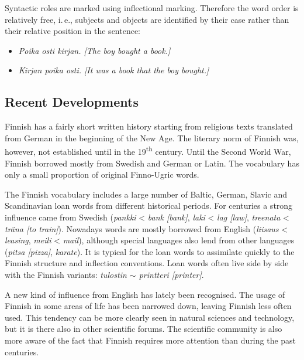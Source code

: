\begin{multicols}{2}
Syntactic roles are marked using inflectional marking. Therefore the word order
is relatively free, i.\,e., subjects and objects are identified by their case
rather than their relative position in the sentence:

\begin{itemize}
\item \textit{\foreignlanguage{finnish}{\textit{Poika osti kirjan.}}
              [The boy bought a book.]}

\item \textit{\foreignlanguage{finnish}{\textit{Kirjan poika osti.}}
              [It was a book that the boy bought.]}
\end{itemize}

\subsection{Recent Developments}

Finnish has a fairly short written history starting from religious texts translated from German in the beginning of the New Age. The literary norm of Finnish was, however, not established until in the 19\textsuperscript{th} century. Until the Second World War, Finnish borrowed mostly from Swedish and German or Latin. The vocabulary has only a small proportion of original Finno-Ugric words.

The Finnish vocabulary includes a large number of Baltic, German, Slavic and
Scandinavian loan words from different historical periods. For centuries a
strong influence came from Swedish
 ({\foreignlanguage{finnish}{\textit{pankki}}} < \textit{bank [bank]},
  {\foreignlanguage{finnish}{\textit{laki}}} < \textit{lag [law]},
  {\foreignlanguage{finnish}{\textit{treenata}}} < \textit{träna [to train]}).
Nowadays words are mostly borrowed from English
 ({\foreignlanguage{finnish}{\textit{liisaus}}} < \textit{leasing},
  {\foreignlanguage{finnish}{\textit{meili}}} < \textit{mail}),
although special languages also lend from
other languages
 (\textit{\foreignlanguage{finnish}{\textit{pitsa}} [pizza]},
  \textit{\foreignlanguage{finnish}{\textit{karate}}}).
It is typical for the loan words to
assimilate quickly to the Finnish structure and inflection conventions. Loan
words often live side by side with the Finnish variants:
\textit{\foreignlanguage{finnish}{\textit{tulostin}} $\sim$
        \foreignlanguage{finnish}{\textit{printteri}} [printer]}.

      A new kind of influence from English has lately been recognised. The usage of Finnish in some areas of life has been narrowed down, leaving Finnish less often used. This tendency can be more clearly seen in natural sciences and technology, but it is there also in other scientific forums. The scientific community is also more aware of the fact that Finnish requires more attention than during the past centuries.


\end{multicols}
